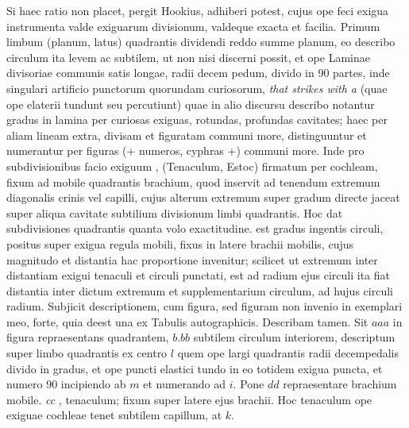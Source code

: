 \pstart Si haec ratio non placet, pergit Hookius\protect{},  adhiberi potest, cujus ope feci exigua instrumenta valde exiguarum divisionum, valdeque exacta et facilia. Primum limbum (planum, latus) quadrantis\protect{} dividendi reddo summe planum,  eo describo circulum ita levem ac subtilem, ut non nisi discerni possit, et ope Laminae divisoriae communis satis longae, radii decem pedum, divido in 90 partes, inde singulari artificio punctorum quorundam curiosorum, \textit{that strikes with a}  (quae ope elaterii tundunt seu percutiunt) quae in alio discursu describo notantur gradus in lamina per curiosas exiguas, rotundas, profundas cavitates; haec per aliam lineam extra, divisam et figuratam communi more, distinguuntur et numerantur per figuras (+ numeros, cyphras +) communi more. Inde pro subdivisionibus facio exiguum , (Tenaculum\protect{}, Estoc) firmatum per coch\-leam, fixum ad mobile quadrantis\protect{} brachium, quod inservit ad tenendum extremum diagonalis crinis vel capilli, cujus alterum extremum super gradum  directe jaceat super aliqua cavitate subtilium divisionum limbi quadrantis\protect{}. Hoc dat subdivisiones quadrantis\protect{} quanta volo exactitudine.  est gradus ingentis circuli, positus super exigua regula mobili, fixus in latere brachii mobilis, cujus magnitudo et distantia hac proportione invenitur; scilicet ut extremum inter distantiam exigui tenaculi et circuli punctati, est ad radium ejus circuli ita fiat distantia inter dictum extremum et supplementarium circulum, ad hujus circuli radium. Subjicit descriptionem, cum figura, sed figuram non invenio in exemplari meo, forte, quia deest una ex Tabulis autographicis. Describam tamen. Sit $aaa$ in figura  repraesentans quadrantem\protect{}, $b.bb$ subtilem circulum interiorem, descriptum super limbo quadrantis\protect{} ex centro $l$ quem ope largi quadrantis\protect{} radii decempedalis divido in gradus, et ope puncti elastici tundo in eo totidem exigua puncta, et numero 90 incipiendo ab $m$ et numerando ad $i$. Pone $dd$ repraesentare brachium mobile. \textit{cc} , tenaculum\protect{}; fixum super latere ejus brachii. Hoc tenaculum ope exiguae cochleae tenet subtilem capillum, at $k$. \pend 
